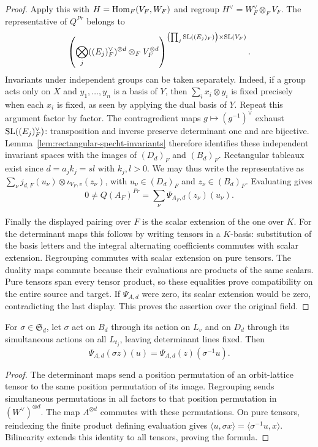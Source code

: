 \begin{proof}
Apply this with $H=\operatorname{Hom}_F(V_F,W_F)$ and regroup
$H^\vee=W_F^\vee\otimes_F V_F$. The representative of $Q^{Pr}$ belongs to
\[
 \left(\bigotimes_j((E_j)_F^\vee)^{\otimes d}
                 \otimes_F V_F^{\otimes d}\right)
 ^{\left(\prod_j\operatorname{SL}((E_j)_F)\right)\times\operatorname{SL}(V_F)}.
\]
Invariants under independent groups can be taken separately. Indeed, if a
group acts only on $X$ and $y_1,\ldots,y_n$ is a basis of $Y$, then
$\sum_i x_i\otimes y_i$ is fixed precisely when each $x_i$ is fixed, as
seen by applying the dual basis of $Y$. Repeat this argument factor by
factor. The contragredient maps $g\mapsto(g^{-1})^\vee$ exhaust
$\operatorname{SL}((E_j)_F^\vee)$: transposition and inverse preserve determinant one
and are bijective. Lemma~\ref{lem:rectangular-specht-invariants} therefore
identifies these independent invariant spaces with the images of
$(D_d)_F$ and $(B_d)_F$. Rectangular tableaux exist since
$d=a_jk_j=sl$ with $k_j,l>0$. We may thus write the representative as
$\sum_\nu j_{d,F}(u_\nu)\otimes\iota_{V_F,v}(z_\nu)$, with
$u_\nu\in(D_d)_F$ and $z_\nu\in(B_d)_F$. Evaluating gives
\[
 0\ne Q(A_F)^{Pr}=\sum_\nu\Psi_{A_F,d}(z_\nu)(u_\nu).
\]

Finally the displayed pairing over $F$ is the scalar extension of the one
over $K$. For the determinant maps this follows by writing tensors in a
$K$-basis: substitution of the basis letters and the integral alternating
coefficients commutes with scalar extension. Regrouping commutes with scalar
extension on pure tensors. The duality maps commute because their evaluations
are products of the same scalars. Pure tensors span every tensor product,
so these equalities prove compatibility on the entire source and target.
If $\Psi_{A,d}$ were zero, its scalar extension would be zero, contradicting
the last display. This proves the assertion over the original field.
\end{proof}

\begin{lemma}
\label{lem:canonical-pairing-equivariance}
\leanok
For $\sigma\in\mathfrak S_d$, let $\sigma$ act on $B_d$ through its action
on $L_v$ and on $D_d$ through its simultaneous actions on all $L_{t_j}$,
leaving determinant lines fixed. Then
\[
 \Psi_{A,d}(\sigma z)(u)=\Psi_{A,d}(z)(\sigma^{-1}u).
\]
\end{lemma}
\begin{proof}
The determinant maps send a position permutation of an orbit-lattice tensor
to the same position permutation of its image. Regrouping sends simultaneous
permutations in all factors to that position permutation in
$(W^\vee)^{\otimes d}$. The map $A^{\otimes d}$ commutes with these
permutations. On pure tensors, reindexing the finite product defining
evaluation gives $\langle u,\sigma x\rangle=\langle\sigma^{-1}u,x\rangle$.
Bilinearity extends this identity to all tensors, proving the formula.
\end{proof}

